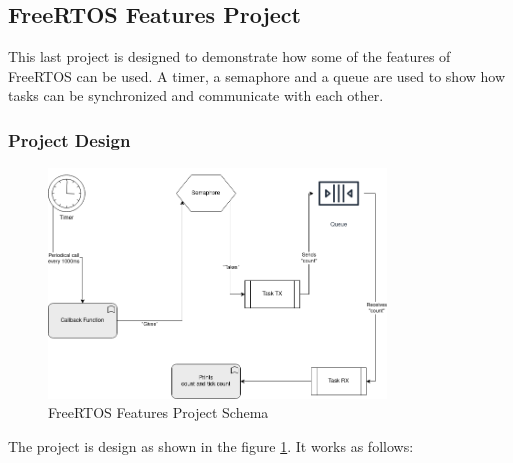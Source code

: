 \subsection{FreeRTOS Features Project}

This last project is designed to demonstrate how some of the features of FreeRTOS can be used. A timer, a semaphore and a queue are used to show how tasks can be synchronized and communicate with each other.

\subsubsection{Project Design}

\begin{figure}[ht]
    \centering
    \includegraphics[width=0.8\textwidth]{images/projects/project_feature_schema.png}
    \caption{FreeRTOS Features Project Schema}
    \label{fig:project_feature_schema}
\end{figure}

The project is design as shown in the figure \ref{fig:project_feature_schema}. It works as follows:


